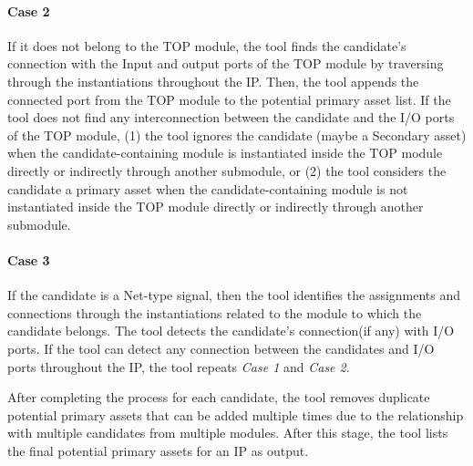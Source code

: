 \paragraph*{Case 2} If it does not belong to the TOP module, the tool finds the candidate's connection with the Input and output ports of the TOP module by traversing through the instantiations throughout the IP. Then, the tool appends the connected port from the TOP module to the potential primary asset list. If the tool does not find any interconnection between the candidate and the I/O ports of the TOP module, (1) the tool ignores the candidate (maybe a Secondary asset) when the candidate-containing module is instantiated inside the TOP module directly or indirectly through another submodule, or (2) the tool considers the candidate a primary asset when the candidate-containing module is not instantiated inside the TOP module directly or indirectly through another submodule.

\paragraph*{Case 3} If the candidate is a Net-type signal, then the tool identifies the assignments and connections through the instantiations related to the module to which the candidate belongs. The tool detects the candidate's connection(if any) with I/O ports. If the tool can detect any connection between the candidates and I/O ports throughout the IP, the tool repeats \textit{Case 1} and \textit{Case 2}.

After completing the process for each candidate, the tool removes duplicate potential primary assets that can be added multiple times due to the relationship with multiple candidates from multiple modules.
After this stage, the tool lists the final potential primary assets for an \ac{IP} as output.



